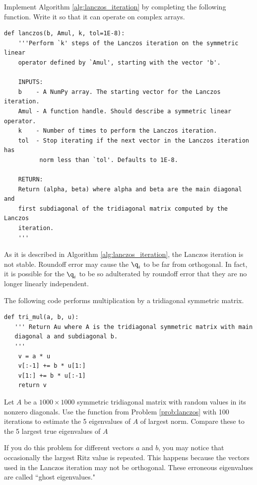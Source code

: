 \begin{problem}
\label{prob:lanczos}
Implement Algorithm \ref{alg:lanczos_iteration} by completing the following function.
Write it so that it can operate on complex arrays.
\begin{lstlisting}
def lanczos(b, Amul, k, tol=1E-8):
    '''Perform `k' steps of the Lanczos iteration on the symmetric linear
    operator defined by `Amul', starting with the vector 'b'.

    INPUTS:
    b    - A NumPy array. The starting vector for the Lanczos iteration.
    Amul - A function handle. Should describe a symmetric linear operator.
    k    - Number of times to perform the Lanczos iteration.
    tol  - Stop iterating if the next vector in the Lanczos iteration has
          norm less than `tol'. Defaults to 1E-8.

    RETURN:
    Return (alpha, beta) where alpha and beta are the main diagonal and
    first subdiagonal of the tridiagonal matrix computed by the Lanczos
    iteration.
    '''
\end{lstlisting}
\end{problem}

As it is described in Algorithm \ref{alg:lanczos_iteration}, the Lanczos iteration is not stable.
Roundoff error may cause the $\q_i$ to be far from orthogonal.
In fact, it is possible for the $\q_i$ to be so adulterated by roundoff error that they are no longer linearly independent.

\begin{problem}
The following code performs multiplication by a tridiagonal symmetric matrix.

\begin{lstlisting}
def tri_mul(a, b, u):
   ''' Return Au where A is the tridiagonal symmetric matrix with main
   diagonal a and subdiagonal b.
   '''
    v = a * u
    v[:-1] += b * u[1:]
    v[1:] += b * u[:-1]
    return v
\end{lstlisting}

Let $A$ be a $1000\times 1000$ symmetric tridiagonal matrix with random values in its nonzero diagonals.
Use the function  from Problem \ref{prob:lanczos} with 100 iterations to estimate the 5 eigenvalues of $A$ of largest norm.
Compare these to the 5 largest true eigenvalues of $A$

If you do this problem for different vectors $a$ and $b$, you may notice that occasionally the largest Ritz value is repeated.
This happens because the vectors used in the Lanczos iteration may not be orthogonal.
These erroneous eigenvalues are called ``ghost eigenvalues."
\end{problem}

